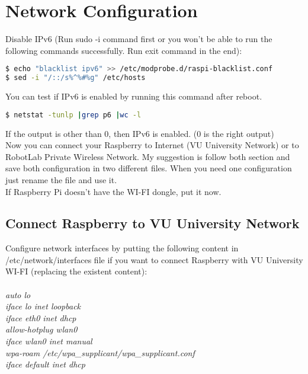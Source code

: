 \documentclass[12pt]{article}%
\begin{document}
\section{Network Configuration}
	Disable IPv6 (Run sudo -i command first or you won't be able to run the following commands successfully. Run exit command in the end):
	\begin{lstlisting}[language=Bash]
$ echo "blacklist ipv6" >> /etc/modprobe.d/raspi-blacklist.conf
$ sed -i "/::/s%^%#%g" /etc/hosts
	\end{lstlisting}
	You can test if IPv6 is enabled by running this command after reboot.
	\begin{lstlisting}[language=Bash]
$ netstat -tunlp |grep p6 |wc -l
	\end{lstlisting}
	If the output is other than 0, then IPv6 is enabled. (0 is the right output)\\
	
	Now you can connect your Raspberry to Internet (VU University Network) or to RobotLab Private Wireless Network. My suggestion is follow both section and save both configuration in two different files. When you need one configuration just rename the file and use it.\\
	If Raspberry Pi doesn't have the WI-FI dongle, put it now.
	
	\subsection{Connect Raspberry to VU University Network}
		Configure network interfaces by putting the following content in /etc/network/interfaces file if you want to connect Raspberry with VU University WI-FI (replacing the existent content):\\\\
		\textit{auto lo\\
			iface lo inet loopback\\
			iface eth0 inet dhcp\\
			allow-hotplug wlan0 \\
			iface wlan0 inet manual \\
			wpa-roam /etc/wpa\_supplicant/wpa\_supplicant.conf\\
			iface default inet dhcp\\\\}
		
\end{document}
